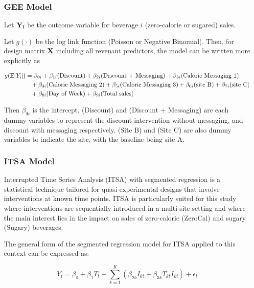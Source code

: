 \documentclass[
]{article}
\begin{document}
\hypertarget{gee-model}{%
\subsubsection{GEE Model}\label{gee-model}}

Let \({\bf Y_i}\) be the outcome variable for beverage \(i\)
(zero-calorie or sugared) sales.

Let \(g(\cdot)\) be the log link function (Poisson or Negative
Binomial). Then, for design matrix \({\bf X}\) including all revenant
predictors, the model can be written more explicitly as

\begin{align*}
g(\mathbb{E}[Y_i]) &= \beta_{0i} + \beta_{1i} (\text{Discount}) + \beta_{2i} (\text{Discount + Messaging}) + \beta_{3i} (\text{Calorie Messaging 1})  \\
&\hspace{3mm} + \beta_{4i} (\text{Calorie Messaging 2}) + \beta_{5i} (\text{Calorie Messaging 3}) + \beta_{6i} (\text{site B}) + \beta_{7i} (\text{site C})\\
&\hspace{3mm} + \beta_{8i} (\text{Day of Week})+ \beta_{9i} (\text{Total sales})
\end{align*}

Then \(\beta_{0i}\) is the intercept. (Discount) and (Discount +
Messaging) are each dummy variables to represent the discount
intervention without messaging, and discount with messaging
respectively. (Site B) and (Site C) are also dummy variables to indicate
the site, with the baseline being site A.

\hypertarget{itsa-model}{%
\subsubsection{ITSA Model}\label{itsa-model}}

Interrupted Time Series Analysis (ITSA) with segmented regression is a
statistical technique tailored for quasi-experimental designs that
involve interventions at known time points. ITSA is particularly suited
for this study where interventions are sequentially introduced in a
multi-site setting and where the main interest lies in the impact on
sales of zero-calorie (ZeroCal) and sugary (Sugary) beverages.

The general form of the segmented regression model for ITSA applied to
this context can be expressed as:

\[Y_t = \beta_0 + \beta_1 T_t + \sum_{k=1}^{K} (\beta_{2k} I_{kt} + \beta_{3k} T_{kt} I_{kt}) + \epsilon_t \]
\end{document}
